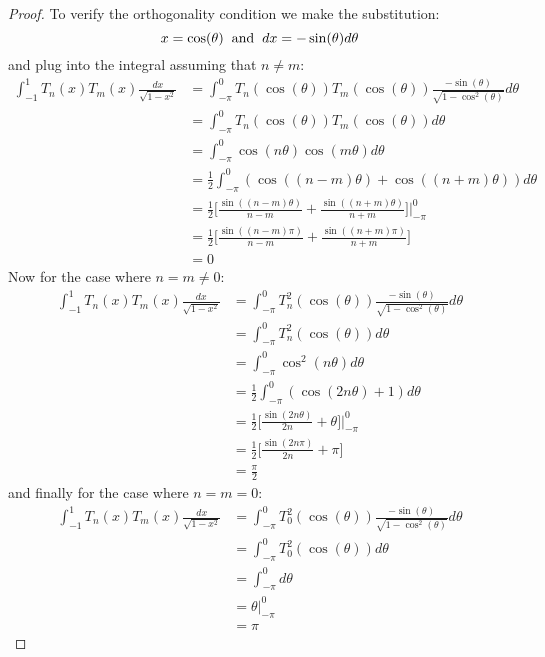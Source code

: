 \documentclass[12pt, letterpaper, onecolumn, conference, final]{IEEEtran}
\theoremstyle{definition}
\theoremstyle{plain}
\begin{document}
\begin{proof}
To verify the orthogonality condition we make the substitution:
\begin{equation*}
x = \cos(\theta) \hspace{.2cm} \text{and} \hspace{.2cm} dx = -\sin(\theta) d\theta
\end{equation*}
and plug into the integral assuming that $n \neq m$:
\begin{equation*}
\begin{split}
\int_{-1}^1 T_n(x)T_m(x) \frac{dx}{\sqrt{1 - x^2}} &= \int_{-\pi}^0 T_n(\cos(\theta))T_m(\cos(\theta)) \frac{-\sin(\theta)}{\sqrt{1 - \cos^2(\theta)}} d\theta \\
&= \int_{-\pi}^0 T_n(\cos(\theta))T_m(\cos(\theta)) d\theta \\
&= \int_{-\pi}^0 \cos(n\theta)\cos(m\theta) d\theta \\
&= \frac{1}{2}\int_{-\pi}^0 (\cos((n - m)\theta) + \cos((n + m)\theta)) d\theta \\
&=  \frac{1}{2} \Big[ \frac{\sin((n - m)\theta)}{n - m} + \frac{\sin((n + m)\theta)}{n + m} \Big] \Big|_{-\pi}^0 \\
&= \frac{1}{2} \Big[ \frac{\sin((n - m)\pi)}{n - m} + \frac{\sin((n + m)\pi)}{n + m} \Big] \\
&= 0
\end{split}
\end{equation*}
Now for the case where $n = m \neq 0$:
\begin{equation*}
\begin{split}
\int_{-1}^1 T_n(x)T_m(x) \frac{dx}{\sqrt{1 - x^2}} &= \int_{-\pi}^0 T_n^2(\cos(\theta)) \frac{-\sin(\theta)}{\sqrt{1 - \cos^2(\theta)}} d\theta \\
&= \int_{-\pi}^0 T_n^2(\cos(\theta)) d\theta \\
&= \int_{-\pi}^0 \cos^2(n\theta) d\theta \\
&= \frac{1}{2} \int_{-\pi}^0 (\cos(2n\theta) + 1) d\theta \\
&= \frac{1}{2} \Big[ \frac{\sin(2n\theta)}{2n} + \theta \Big] \Big|_{-\pi}^0 \\
&= \frac{1}{2} \Big[ \frac{\sin(2n\pi)}{2n} + \pi \Big] \\
&= \frac{\pi}{2}
\end{split}
\end{equation*}
and finally for the case where $n = m = 0$:
\begin{equation*}
\begin{split}
\int_{-1}^1 T_n(x)T_m(x) \frac{dx}{\sqrt{1 - x^2}} &= \int_{-\pi}^0 T_0^2(\cos(\theta)) \frac{-\sin(\theta)}{\sqrt{1 - \cos^2(\theta)}} d\theta \\
&= \int_{-\pi}^0 T_0^2(\cos(\theta)) d\theta \\
&= \int_{-\pi}^0 d\theta \\
&= \theta \Big|_{-\pi}^0 \\
&= \pi
\end{split}
\end{equation*}
\end{proof}
\end{document}
